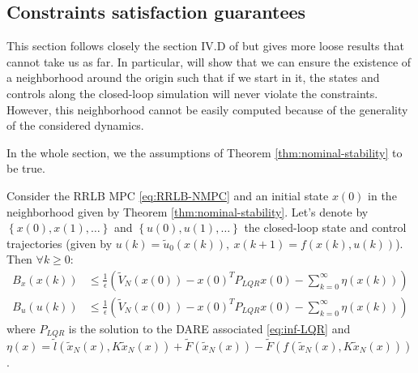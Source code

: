 \documentclass[12pt]{article}
\begin{document}
\subsection{Constraints satisfaction guarantees}\label{sec:constraints-satisfaction-guarantees}
This section follows closely the section IV.D of \cite{RRLB-linear-MPC} but gives more loose results that cannot take us as far.
In particular, will show that we can ensure the existence of a neighborhood around the origin such that if we start in it, the states and controls along the closed-loop simulation will never violate the constraints.
However, this neighborhood cannot be easily computed because of the generality of the considered dynamics.

In the whole section, we the assumptions of Theorem \ref{thm:nominal-stability} to be true.

\begin{lemma}
	\label{thm:RRLB-bounds-guarantees}
	Consider the RRLB MPC \ref{eq:RRLB-NMPC} and an initial state $x(0)$ in the neighborhood given by Theorem \ref{thm:nominal-stability}.
	Let's denote by $\left\{x(0),x(1),\dots\right\}$ and $\left\{u(0), u(1),\dots\right\}$ the closed-loop state and control trajectories (given by $u(k)=\tilde{u}_0(x(k)),~x(k+1)=f(x(k),u(k))$).
	Then $\forall k\geq 0$:
	\begin{align*}
		B_x(x(k))&\leq\frac{1}{\epsilon}\left(\tilde{V}_N(x(0))-x(0)^TP_{LQR}x(0)-\sum_{k=0}^\infty\eta(x(k))\right)\\
		B_u(u(k))&\leq\frac{1}{\epsilon}\left(\tilde{V}_N(x(0))-x(0)^TP_{LQR}x(0)-\sum_{k=0}^\infty\eta(x(k))\right)
	\end{align*}
	where $P_{LQR}$ is the solution to the DARE associated \ref{eq:inf-LQR} and $\eta(x)=\tilde{l}(\tilde{x}_N(x),K\tilde{x}_N(x))+\tilde{F}(\tilde{x}_N(x))-\tilde{F}(f(\tilde{x}_N(x), K\tilde{x}_N(x)))$.
\end{lemma}
\end{document}
